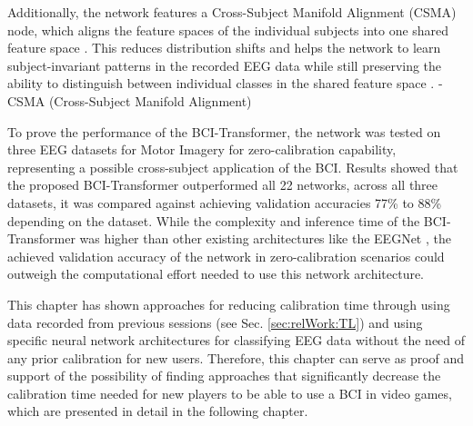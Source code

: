 Additionally, the network features a Cross-Subject Manifold Alignment (CSMA) node, which aligns the feature spaces of the individual subjects into one shared feature space \cite{jiang-2026}. This reduces distribution shifts and helps the network to learn subject-invariant patterns in the recorded EEG data while still preserving the ability to distinguish between individual classes in the shared feature space \cite{jiang-2026}. %
- CSMA (Cross-Subject Manifold Alignment)



To prove the performance of the BCI-Transformer, the network was tested on three EEG datasets for Motor Imagery %
for zero-calibration capability, representing a possible cross-subject application of the BCI. Results showed that the proposed BCI-Transformer outperformed all 22 networks, across all three datasets, it was compared against achieving validation accuracies 77\% to 88\% depending on the dataset. While the complexity and inference time of the BCI-Transformer was higher than other existing architectures like the EEGNet \cite{jiang-2026}, the achieved validation accuracy of the network in zero-calibration scenarios could outweigh the computational effort needed to use this network architecture. %

This chapter has shown approaches for reducing calibration time through using data recorded from previous sessions (see Sec. \ref{sec:relWork:TL}) and using specific neural network architectures for classifying EEG data without the need of any prior calibration for new users. Therefore, this chapter can serve as proof and support of the possibility of finding approaches that significantly decrease the calibration time needed for new players to be able to use a BCI in video games, which are presented in detail in the following chapter. %


